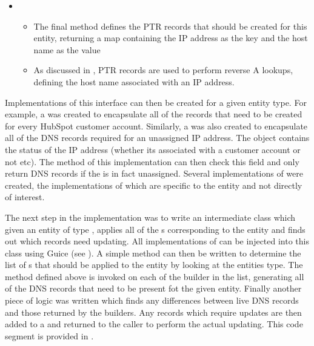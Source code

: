 \begin{itemize}
      \item{}
      \begin{itemize}
            \item{The final method defines the PTR records that should be created for this entity, returning a map containing the IP address as the key and the host name as the value}
            \item{As discussed in , PTR records are used to perform reverse A lookups, defining the host name associated with an IP address.}
      \end{itemize}
\end{itemize}

Implementations of this interface can then be created for a given entity type. For example, a  was created to encapsulate all of the records that need to be created for every HubSpot customer account. Similarly, a  was also created to encapsulate all of the DNS records required for an unassigned IP address. The  object contains the status of the IP address (whether its associated with a customer account or not etc). The  method of this implementation can then check this field and only return DNS records if the  is in fact unassigned. Several implementations of  were created, the implementations of which are specific to the entity and not directly of interest.

The next step in the implementation was to write an intermediate class which given an entity of type , applies all of the s corresponding to the entity and finds out which records need updating. All implementations of  can be injected into this class using Guice (see ). A simple method can then be written to determine the list of s that should be applied to the entity by looking at the entities type. The  method defined above is invoked on each of the builder in the list, generating all of the DNS records that need to be present fot the given entity. Finally another piece of logic was written which finds any differences between live DNS records and those returned by the builders. Any records which require updates are then added to a  and returned to the caller to perform the actual updating. This code segment is provided in  .

